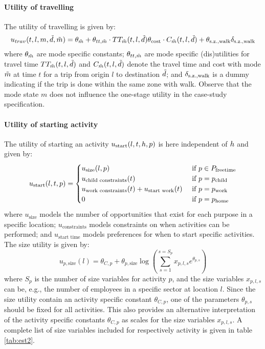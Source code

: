 \paragraph{Utility of travelling}
The utility of travelling is given by:
\begin{equation} \label{eq:utravel}
u_{trav}(t,l,m,\act{d},\act{m}) = \mc_{\act{m}} + \theta_{tt,\act{m}} \cdot \TT_{\act{m}}(t,l,\act{d}) \theta_{\cost} \cdot C_{\act{m}}(t,l,\act{d}) +\theta_{\geqfive} \dummy{\geqfive}
\end{equation}
where $\theta_{\tilde{m}}$ are mode specific constants; $\theta_{tt,\tilde{m}}$ are mode specific (dis)utilities for travel time  $TT_{\tilde{m}}(t,l,\tilde{d})$ and $C_{\tilde{m}}(t,l,\tilde{d})$ denote the travel time and cost with mode $\tilde{m}$ at time $t$ for a trip from origin $l$ to destination $\tilde{d}$; and $\delta_{\text{s.z.,walk}}$ is a dummy indicating if the trip is done within the same zone with walk. Observe that the mode state $m$ does not influence the one-stage utility in the case-study specification.

\paragraph{Utility of starting activity}
The utility of starting an activity $u_\text{start}(l,t,h, p)$ is here independent of $h$ and given by:
\begin{equation}
	\ustart(l,t,p) = \begin{cases}
	u_{\text{size}}(l,p) & \cif p \in P_{\text{freetime}} \\
	u_\text{child constraints}(t) & \cif p = \p{child} \\
	u_\text{work constraints}(t)  + u_{\text{start work}}(t) & \cif p = \p{work} \\
	0 & \cif p = \p{home}  
	\end{cases} 
\end{equation}
where $u_{\text{size}}$ models the number of opportunities that exist for each purpose in a specific location; $u_\text{constraints}$ models constraints on when activities can be performed; and $u_{\text{start time}}$ models preferences for when to start specific activities. The size utility is given by:
\begin{equation*}
u_{p,\text{size}}(l) =\theta_{C,p} + \theta_{p,\text{size}}\log \left( \sum_{s=1}^{s=S_p} x_{p,l,s}e^{\theta_{p,s}} \right)
\end{equation*}
where $S_p$ is the number of size variables for activity $p$, and the size variables $x_{p,l,s}$ can be, e.g., the number of employees in a specific sector at location $l$. Since the size utility contain an activity specific constant $\theta_{C,p}$, one of the parameters $\theta_{p,s}$ should be fixed for all activities. This also provides an alternative interpretation of the activity specific constants $\theta_{C,p}$ as scales for the size variables $x_{p,l,s}$. A complete list of size variables included for respectively activity is given in table \ref{tab:est2}. 


